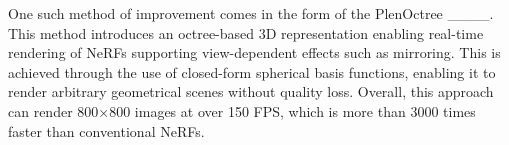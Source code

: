 One such method of improvement comes in the form of the PlenOctree ____. This method introduces an octree-based 3D representation enabling real-time rendering of NeRFs supporting view-dependent effects such as mirroring. This is achieved through the use of closed-form spherical basis functions, enabling it to render arbitrary geometrical scenes without quality loss. Overall, this approach can render 800×800 images at over 150 FPS, which is more than 3000 times faster than conventional NeRFs.